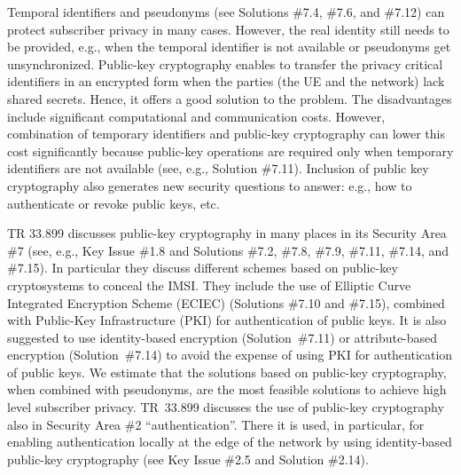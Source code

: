 \documentclass[12pt]{llncs}
\begin{document}
Temporal identifiers and pseudonyms (see Solutions \#7.4, \#7.6, and \#7.12) can protect subscriber privacy in many cases. However, the real identity still needs to be provided, e.g., when the temporal identifier is not available or pseudonyms get unsynchronized. Public-key cryptography enables to transfer the privacy critical identifiers in an encrypted form when the parties (the UE and the network) lack shared secrets. Hence, it offers a good solution to the problem. The disadvantages include significant computational and communication costs. However, combination of temporary identifiers and public-key cryptography can lower this cost significantly because public-key operations are required only when temporary identifiers are not available (see, e.g., Solution \#7.11). Inclusion of public key cryptography also generates new security questions to answer: e.g., how to authenticate or revoke public keys, etc.

TR 33.899 discusses public-key cryptography in many places in its Security Area \#7 (see, e.g., Key Issue \#1.8 and Solutions \#7.2, \#7.8, \#7.9, \#7.11, \#7.14, and \#7.15). In particular they discuss different schemes based on public-key cryptosystems to conceal the IMSI. They include the use of Elliptic Curve Integrated Encryption Scheme (ECIEC) (Solutions \#7.10 and \#7.15), combined with Public-Key Infrastructure (PKI) for authentication of public keys. It is also suggested to use identity-based encryption (Solution~\#7.11) or attribute-based encryption (Solution~\#7.14) to avoid the expense of using PKI for authentication of public keys. We estimate that the solutions based on public-key cryptography, when combined with pseudonyms, are the most feasible solutions to achieve high level subscriber privacy. TR~33.899 discusses the use of public-key cryptography also in Security Area \#2 ``authentication''. There it is used, in particular, for enabling authentication locally at the edge of the network by using identity-based public-key cryptography (see Key Issue \#2.5 and Solution \#2.14).




\end{document}
